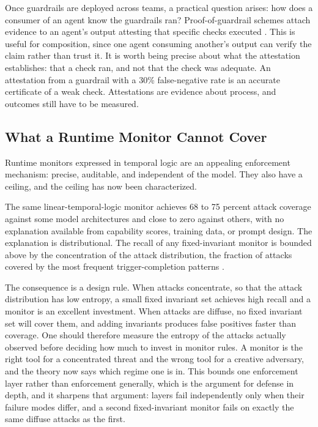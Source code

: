 \documentclass[11pt]{book}
\begin{document}
Once guardrails are deployed across teams, a practical question arises: how does a consumer of an agent know the guardrails ran? Proof-of-guardrail schemes attach evidence to an agent's output attesting that specific checks executed \cite{proofguardrail2026}. This is useful for composition, since one agent consuming another's output can verify the claim rather than trust it. It is worth being precise about what the attestation establishes: that a check ran, and not that the check was adequate. An attestation from a guardrail with a 30\% false-negative rate is an accurate certificate of a weak check. Attestations are evidence about process, and outcomes still have to be measured.

\subsection{What a Runtime Monitor Cannot Cover}

Runtime monitors expressed in temporal logic are an appealing enforcement mechanism: precise, auditable, and independent of the model. They also have a ceiling, and the ceiling has now been characterized.

The same linear-temporal-logic monitor achieves 68 to 75 percent attack coverage against some model architectures and close to zero against others, with no explanation available from capability scores, training data, or prompt design. The explanation is distributional. The recall of any fixed-invariant monitor is bounded above by the concentration of the attack distribution, the fraction of attacks covered by the most frequent trigger-completion patterns \cite{monitorbound2026}.

The consequence is a design rule. When attacks concentrate, so that the attack distribution has low entropy, a small fixed invariant set achieves high recall and a monitor is an excellent investment. When attacks are diffuse, no fixed invariant set will cover them, and adding invariants produces false positives faster than coverage. One should therefore measure the entropy of the attacks actually observed before deciding how much to invest in monitor rules. A monitor is the right tool for a concentrated threat and the wrong tool for a creative adversary, and the theory now says which regime one is in. This bounds one enforcement layer rather than enforcement generally, which is the argument for defense in depth, and it sharpens that argument: layers fail independently only when their failure modes differ, and a second fixed-invariant monitor fails on exactly the same diffuse attacks as the first.
\end{document}
